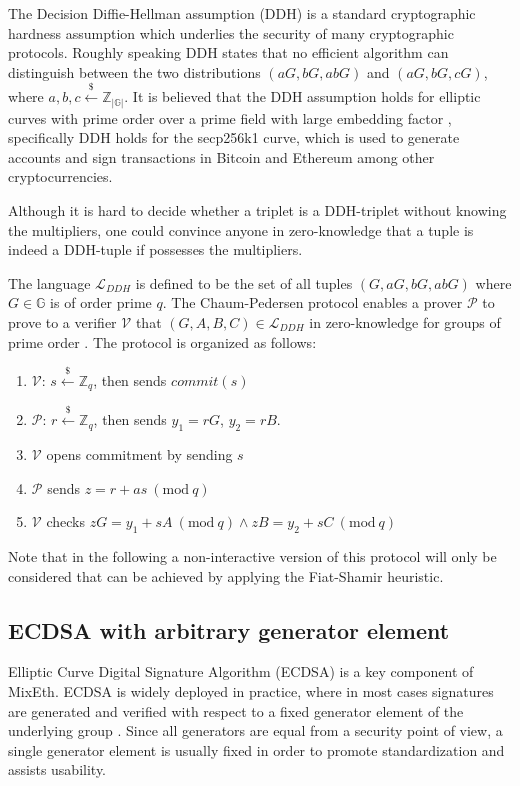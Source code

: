 \documentclass[a4paper]{article}
\theoremstyle{definition}
\newcommand{\Mod}[1]{\ (\mathrm{mod}\ #1)}
\begin{document}
The Decision Diffie-Hellman assumption (DDH) is a standard cryptographic hardness assumption which underlies the security of many cryptographic protocols. Roughly speaking DDH states that no efficient algorithm can distinguish between the two distributions $(aG, bG, abG)$ and $(aG, bG, cG)$, where $a,b,c\stackrel{\$}{\leftarrow}\mathbb{Z}_{|\mathbb{G}|}$. It is believed that the DDH assumption holds for elliptic curves with prime order over a prime field with large embedding factor \cite{boneh1998decision}, specifically DDH holds for the secp256k1 curve, which is used to generate accounts and sign transactions in Bitcoin and Ethereum among other cryptocurrencies. 

 Although it is hard to decide whether a triplet is a DDH-triplet without knowing the multipliers, one could convince anyone in zero-knowledge that a tuple is indeed a DDH-tuple if possesses the multipliers.    

The language $\mathcal{L}_{DDH}$ is defined to be the set of all tuples $(G,aG,bG,abG)$ where $G\in \mathbb{G}$ is of order prime $q$. The Chaum-Pedersen protocol enables a prover $\mathcal{P}$ to prove to a verifier $\mathcal{V}$ that $(G,A,B,C)\in\mathcal{L}_{DDH}$ in zero-knowledge for groups of prime order \cite{chaum1992wallet}. The protocol is organized as follows:

\begin{enumerate}
	\item $\mathcal{V}$: $s\stackrel{\$}{\leftarrow}\mathbb{Z}_q$, then sends $commit(s)$ 
	\item $\mathcal{P}$: $r\stackrel{\$}{\leftarrow}\mathbb{Z}_q$, then sends $y_1=rG$, $y_2=rB$.
	\item $\mathcal{V}$ opens commitment by sending $s$
	\item $\mathcal{P}$ sends $z=r+as \Mod{q}$
	\item $\mathcal{V}$ checks $zG=y_{1}+sA \Mod{q} \land zB=y_{2}+sC \Mod{q}$
\end{enumerate} 
Note that in the following a non-interactive version of this protocol will only be considered that can be achieved by applying the Fiat-Shamir heuristic. 

\subsection{ECDSA with arbitrary generator element}
Elliptic Curve Digital Signature Algorithm (ECDSA) is a key component of MixEth. ECDSA is widely deployed in practice, where in most cases signatures are generated and verified with respect to a fixed generator element of the underlying group \cite{fersch2016provable}. Since all generators are equal from a security point of view, a single generator element is usually fixed in order to promote standardization and assists usability.
\end{document}
